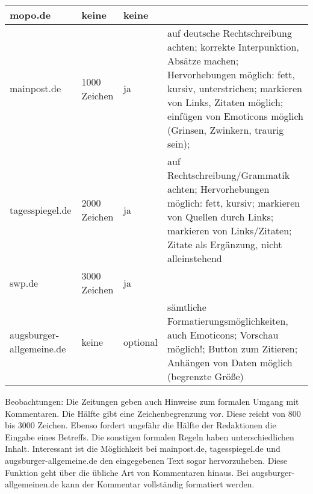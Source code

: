 \begin{landscape}
\begin{longtable}{l|llp{100mm}}
mopo.de			& keine & keine & \\\hline
mainpost.de		& 1000 Zeichen & ja & auf deutsche Rechtschreibung achten; korrekte Interpunktion, Absätze machen; Hervorhebungen möglich: fett, kursiv, unterstrichen; markieren von Links, Zitaten möglich; einfügen von Emoticons möglich (Grinsen, Zwinkern, traurig sein); \\\hline
tagesspiegel.de		& 2000 Zeichen & ja & auf Rechtschreibung/Grammatik achten; Hervorhebungen möglich: fett, kursiv; markieren von Quellen durch Links; markieren von Links/Zitaten; Zitate als Ergänzung, nicht alleinstehend \\\hline
swp.de			& 3000 Zeichen & ja & \\ \hline
augsburger-allgemeine.de	& keine & optional & sämtliche Formatierungsmöglichkeiten, auch Emoticons; Vorschau möglich!; Button zum Zitieren; Anhängen von Daten möglich (begrenzte Größe)\\ \hline

\end{longtable}
\end{landscape}

Beobachtungen:
Die Zeitungen geben auch Hinweise zum formalen Umgang mit Kommentaren. Die Hälfte gibt eine Zeichenbegrenzung vor. Diese reicht von 800 bis 3000 Zeichen. 
Ebenso fordert ungefähr die Hälfte der Redaktionen die Eingabe eines Betreffs. Die sonstigen formalen Regeln haben unterschiedlichen Inhalt. Interessant ist die Möglichkeit bei mainpost.de, tagesspiegel.de und augsburger-allgemeine.de den eingegebenen Text sogar hervorzuheben. Diese Funktion geht über die übliche Art von Kommentaren hinaus. Bei augsburger-allgemeinen.de kann der Kommentar vollständig formatiert werden.

